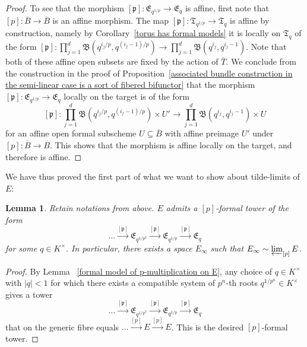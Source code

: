 \documentclass[10pt,oneside]{amsart}
\newtheorem{lemma}[theorem]{Lemma}
\theoremstyle{definition}
\begin{document}
\begin{proof}
		To see that the morphism $[\mathfrak p]:\mathfrak E_{q^{1/p}} \rightarrow  \mathfrak E_{q}$ is affine, first note that $[p]:\overline{B}\rightarrow \overline{B}$ is an affine morphism. The map $[\mathfrak p]:\mathfrak T_{q^{1/p}}\rightarrow \mathfrak T_{q}$ is affine by construction, namely by Corollary~\ref{torus has formal models} it is locally on $\mathfrak T_{q}$ of the form $[\mathfrak p]:\prod_{j=1}^d \mathfrak B(q^{i_j/p},q^{(i_j-1)/p})\rightarrow \prod_{j=1}^d \mathfrak B(q^{i_j},q^{i_j-1})$. Note that both of these affine open subsets are fixed by the action of $\overline{T}$.
		We conclude from the construction in the proof of Proposition~\ref{associated bundle construction in the semi-linear case is a sort of fibered bifunctor} that the morphism  $[\mathfrak p]:\mathfrak E_{q^{1/p}} \rightarrow  \mathfrak E_{q}$ locally on the target is of the form
		\[[\mathfrak p]:\prod_{j=1}^d \mathfrak B(q^{i_j/p},q^{(i_j-1)/p}) \times U' \rightarrow \prod_{j=1}^d \mathfrak B(q^{i_j},q^{i_j-1}) \times U\]
		for an affine open formal subscheme $U\subseteq \overline{B}$ with affine preimage $U'$ under $[p]:\overline{B}\rightarrow \overline{B}$. This shows that the morphism is affine locally on the target, and therefore is affine.
	\end{proof}
	
	We have thus proved the first part of what we want to show about tilde-limits of $E$:
	\begin{lemma}\label{p-formal tower exists for E}
		 Retain notations from above. $E$ admits a $[p]$-formal tower of the form
		\[\dots \xrightarrow{[\mathfrak p]} \mathfrak E_{q^{1/p^2}}\xrightarrow{[\mathfrak p]} \mathfrak E_{q^{1/p}}\xrightarrow{[\mathfrak p]} \mathfrak E_q\]
		for some $q\in K^\times$. In particular, there exists a space $E_\infty$ such that $E_\infty\sim \varprojlim_{[p]}E$.
	\end{lemma}
	\begin{proof}
		By Lemma ~\ref{formal model of p-multiplication on E}, any choice of $q\in K^\times$ with $|q|<1$ for which there exists a compatible system of $p^n$-th roots $q^{1/p^n}\in K^\times$ gives a tower
		\[\dots \xrightarrow{[\mathfrak p]} \mathfrak E_{q^{1/p^2}}\xrightarrow{[\mathfrak p]} \mathfrak E_{q^{1/p}}\xrightarrow{[\mathfrak p]} \mathfrak E_q\]
		that on the generic fibre equals $\dots\xrightarrow{[p]} E\xrightarrow{[p]} E$. This is the desired $[p]$-formal tower.
	\end{proof}
	
\end{document}
